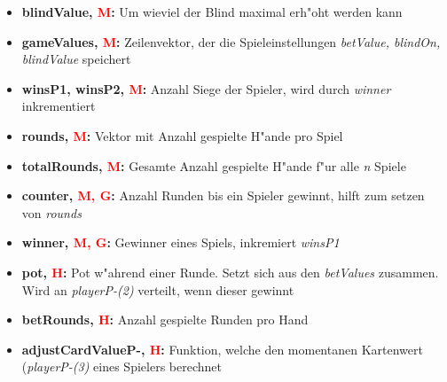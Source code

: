 \documentclass[11pt]{article}
\begin{document}
\begin{itemize}
\item	\textbf{blindValue, \textcolor{red}{M}:} Um wieviel der Blind maximal erh"oht werden kann\\

\item	\textbf{gameValues, \textcolor{red}{M}:} Zeilenvektor, der die Spieleinstellungen \emph{betValue, blindOn, blindValue} speichert\\

\item	\textbf{winsP1, winsP2, \textcolor{red}{M}:} Anzahl Siege der Spieler, wird durch \emph{winner} inkrementiert\\

\item	\textbf{rounds, \textcolor{red}{M}:} Vektor mit Anzahl gespielte H"ande pro Spiel\\

\item	\textbf{totalRounds, \textcolor{red}{M}:} Gesamte Anzahl gespielte H"ande f"ur alle \emph{n} Spiele\\	

\item	\textbf{counter, \textcolor{red}{M, G}:} Anzahl Runden bis ein Spieler gewinnt, hilft zum setzen von \emph{rounds} \\

\item	\textbf{winner, \textcolor{red}{M, G}:} Gewinner eines Spiels, inkremiert \emph{winsP1} \\

\item	\textbf{pot, \textcolor{red}{H}:} Pot w"ahrend einer Runde. Setzt sich aus den \emph{betValues} zusammen. Wird an \emph{playerP-(2)} verteilt, wenn dieser gewinnt \\

\item	\textbf{betRounds, \textcolor{red}{H}:} Anzahl gespielte Runden pro Hand \\

\item	\textbf{adjustCardValueP-, \textcolor{red}{H}:} Funktion, welche den momentanen Kartenwert (\emph{playerP-(3)} eines Spielers berechnet\\



\end{itemize}
\end{document}

